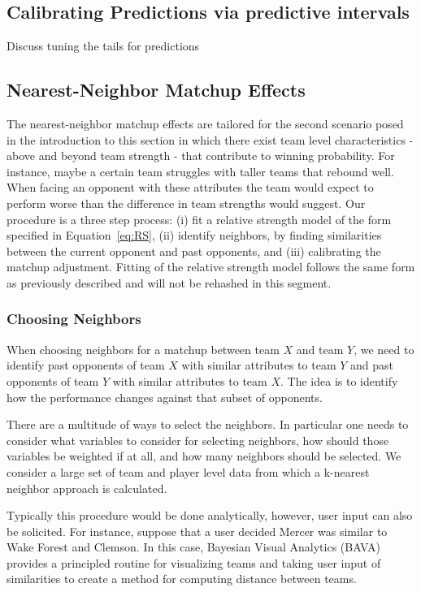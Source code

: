 \subsection{Calibrating Predictions via predictive intervals} Discuss tuning the tails for predictions


\subsection{Nearest-Neighbor Matchup Effects}
The nearest-neighbor matchup effects are tailored for the second scenario posed in the introduction to this section in which there exist team level characteristics - above and beyond team strength - that contribute to winning probability.  For instance, maybe a certain team struggles with taller teams that rebound well.  When facing an opponent with these attributes the team would expect to perform worse than the difference in team strengths would suggest.  Our procedure is a three step process: (i) fit a relative strength model of the form specified in Equation~\ref{eq:RS}, (ii) identify neighbors, by finding similarities between the current opponent and past opponents, and (iii) calibrating the matchup adjustment.  Fitting of the relative strength model follows the same form as previously described and will not be rehashed in this segment.
\subsubsection{Choosing Neighbors}
When choosing neighbors for a matchup between team $X$ and team $Y$, we need to identify past opponents of team $X$ with similar attributes to team $Y$ and past opponents of team $Y$ with similar attributes to team $X.$  The idea is to identify how the performance changes against that subset of opponents.

There are a multitude of ways to select the neighbors.  In particular one needs to consider what variables to consider for selecting neighbors, how should those variables be weighted if at all, and how many neighbors should be selected.  We consider a large set of team and player level data from which a k-nearest neighbor approach is calculated.

Typically this procedure would be done analytically, however, user input can also be solicited.  For instance, suppose that a user decided Mercer was similar to Wake Forest and Clemson.  In this case, Bayesian Visual Analytics (BAVA) provides a principled routine for visualizing teams and taking user input of similarities to create a method for computing distance between teams.
